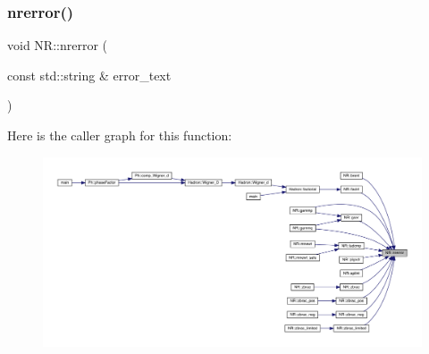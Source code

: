 \mbox{\label{namespaceNR_a61ef7c1cda6052203b5b115ef38e51da}} 
\subsubsection{\texorpdfstring{nrerror()}{nrerror()}}
{\footnotesize\ttfamily void N\+R\+::nrerror (\begin{DoxyParamCaption}\item[{const std\+::string \&}]{error\+\_\+text }\end{DoxyParamCaption})\hspace{0.3cm}{\ttfamily [inline]}}

Here is the caller graph for this function\+:
\nopagebreak
\begin{figure}[H]
\begin{center}
\leavevmode
\includegraphics[width=350pt]{da/d46/namespaceNR_a61ef7c1cda6052203b5b115ef38e51da_icgraph}
\end{center}
\end{figure}
\mbox{\label{namespaceNR_a5393670acc86ad48e87504e8a7109140}} 

